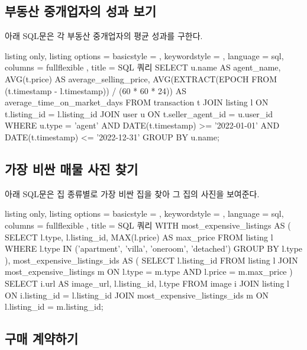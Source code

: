 \documentclass{article}
\begin{document}
\subsection{부동산 중개업자의 성과 보기}

아래 SQL문은 각 부동산 중개업자의 평균 성과를 구한다.

\begin{tcblisting}{
    listing only,
    listing options = {
      basicstyle = \ttfamily,
      keywordstyle = \color{blue},
      language = sql,
      columns = fullflexible
    },
    title = SQL 쿼리
  }
  SELECT
    u.name AS agent_name,
    AVG(t.price) AS average_selling_price,
    AVG(EXTRACT(EPOCH FROM (t.timestamp - l.timestamp))
      / (60 * 60 * 24)) AS average_time_on_market_days
  FROM
    transaction t
  JOIN
    listing l ON t.listing_id = l.listing_id
  JOIN
    user u ON t.seller_agent_id = u.user_id
  WHERE
    u.type = 'agent'
    AND DATE(t.timestamp) >= '2022-01-01'
    AND DATE(t.timestamp) <= '2022-12-31'
  GROUP BY
    u.name;
\end{tcblisting}
\newpage

\subsection{가장 비싼 매물 사진 찾기}

아래 SQL문은 집 종류별로 가장 비싼 집을 찾아 그 집의 사진을 보여준다.

\begin{tcblisting}{
    listing only,
    listing options = {
      basicstyle = \ttfamily,
      keywordstyle = \color{blue},
      language = sql,
      columns = fullflexible
    },
    title = SQL 쿼리
  }
  WITH most_expensive_listings AS (
    SELECT
      l.type,
      l.listing_id,
      MAX(l.price) AS max_price
    FROM
      listing l
    WHERE
      l.type IN ('apartment', 'villa', 'oneroom', 'detached')
    GROUP BY
      l.type
  ),
  most_expensive_listings_ids AS (
    SELECT
      l.listing_id
    FROM
      listing l
    JOIN
      most_expensive_listings m ON l.type = m.type
      AND l.price = m.max_price
  )
  SELECT
    i.url AS image_url,
    l.listing_id,
    l.type
  FROM
    image i
  JOIN
    listing l ON i.listing_id = l.listing_id
  JOIN
    most_expensive_listings_ids m
      ON l.listing_id = m.listing_id;
\end{tcblisting}
\newpage

\subsection{구매 계약하기}
\end{document}
